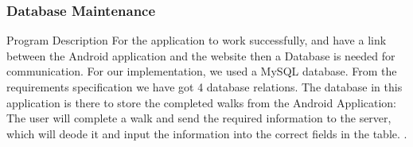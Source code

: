 \documentclass[12pt]{article}
\makeatletter
\renewcommand{\paragraph}{
  \@startsection{paragraph}{4}
  {\z@}{3.25ex \@plus -10em \@minus 1em}{0.1em}
  {\normalfont\normalsize\bfseries}
}
\makeatother
\begin{document}
\subsubsection{Database Maintenance}
\paragraph{Program Description}
For the application to work successfully, and have a link between the Android application and the website then a Database is needed for communication. For our implementation, we used a MySQL database. From the requirements specification we have got 4 database relations. The database in this application is there to store the completed walks from the Android Application: The user will complete a walk and send the required information to the server, which will deode it and input the information into the correct fields in the table. 
.
\end{document}
